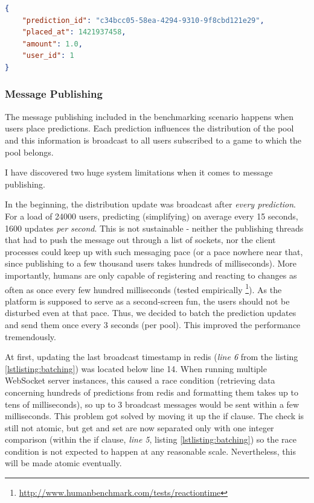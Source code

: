 \documentclass{uvamscse}
\begin{document}
\begin{sourcecode}[h]
\begin{lstlisting}[language=json]
{
    "prediction_id": "c34bcc05-58ea-4294-9310-9f8cbd121e29",
    "placed_at": 1421937458,
    "amount": 1.0,
    "user_id": 1
}
\end{lstlisting}
\caption{Single prediction JSON object.}
\label{lstlisting:prediction}
\end{sourcecode}

\subsubsection{Message Publishing}
The message publishing included in the benchmarking scenario happens when users place predictions. Each prediction influences the distribution of the pool and this information is broadcast to all users subscribed to a game to which the pool belongs.

I have discovered two huge system limitations when it comes to message publishing.

In the beginning, the distribution update was broadcast after \textit{every prediction}. For a load of 24000 users, predicting (simplifying) on average every 15 seconds, 1600 updates \textit{per second}. This is not sustainable - neither the publishing threads that had to push the message out through a list of sockets, nor the client processes could keep up with such messaging pace (or a pace nowhere near that, since publishing to a few thousand users takes hundreds of milliseconds). More importantly, humans are only capable of registering and reacting to changes as often as once every few hundred milliseconds (tested empirically \footnote{\url{http://www.humanbenchmark.com/tests/reactiontime}}). As the platform is supposed to serve as a second-screen fun, the users should not be disturbed even at that pace. Thus, we decided to batch the prediction updates and send them once every 3 seconds (per pool). This improved the performance tremendously.

At first, updating the last broadcast timestamp in redis (\textit{line 6} from the listing \ref{lstlisting:batching}) was located below line 14. When running multiple WebSocket server instances, this caused a race condition (retrieving data concerning hundreds of predictions from redis and formatting them takes up to tens of milliseconds), so up to 3 broadcast messages would be sent within a few milliseconds. This problem got solved by moving it up the if clause. The check is still not atomic, but get and set are now separated only with one integer comparison (within the if clause, \textit{line 5}, listing \ref{lstlisting:batching}) so the race condition is not expected to happen at any reasonable scale. Nevertheless, this will be made atomic eventually.
\end{document}
